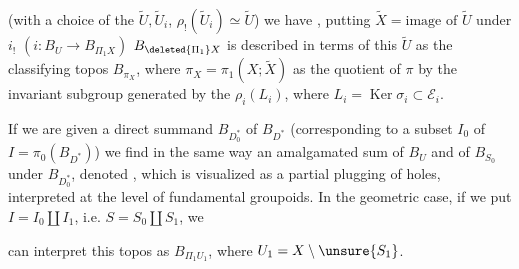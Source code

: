 (with a choice of the $\widetilde U,\widetilde U_i$, $\rho_!(\widetilde U_i)\simeq\widetilde U$) we have
,
putting $\widetilde X=\text{image of }\widetilde U$ under $i_!$ $(i:B_U\longrightarrow B_{\Pi_1 X})$ $B_{\deleted{\Pi_1}X}$ is described in terms of this $\widetilde U$ as the  classifying topos $B_{\pi_X}$, where $\pi_X=\pi_1(X;\widetilde X)$   as the quotient of $\pi$ by the invariant subgroup generated by the $\rho_i(L_i)$, where $L_i=\operatorname{Ker}\sigma_i\subset\mathcal E_i$.

If we are given a direct summand $B_{D_0^*}$ of $B_{D^*}$ (corresponding to a subset $I_0$ of $I=\pi_0(B_{D^*})$) we find in the same way an amalgamated sum of $B_U$ and of $B_{S_0}$ under $B_{D_0^*}$, denoted  , which is visualized as a partial plugging of holes, interpreted at the level of fundamental groupoids. In the geometric case, if we put $I=I_0\amalg I_1$, i.e. $S=S_0\amalg S_1$, we


can interpret this topos as $B_{\Pi_1 U_1}$, where $U_1=X\setminus\unsure{S_1}$. 


